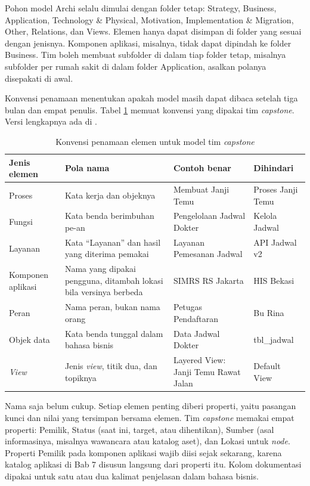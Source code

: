 Pohon model Archi selalu dimulai dengan folder tetap: Strategy, Business,
Application, Technology \& Physical, Motivation, Implementation \& Migration,
Other, Relations, dan Views. Elemen hanya dapat disimpan di folder yang
sesuai dengan jenisnya. Komponen aplikasi, misalnya, tidak dapat dipindah ke
folder Business. Tim boleh membuat subfolder di dalam tiap folder tetap,
misalnya subfolder per rumah sakit di dalam folder Application, asalkan
polanya disepakati di awal.

Konvensi penamaan menentukan apakah model masih dapat dibaca setelah tiga
bulan dan empat penulis. Tabel \ref{tab:ch04-konvensi} memuat konvensi yang
dipakai tim \textit{capstone}. Versi lengkapnya ada di
.

\begin{table}[!htb]
  \centering
  \caption{Konvensi penamaan elemen untuk model tim \textit{capstone}}
  \label{tab:ch04-konvensi}
  \small
  \begin{tabularx}{\textwidth}{>{\raggedright\arraybackslash}p{2.4cm}>{\raggedright\arraybackslash}X>{\raggedright\arraybackslash}p{3.1cm}>{\raggedright\arraybackslash}p{2.6cm}}
    \hline
    \textbf{Jenis elemen} & \textbf{Pola nama} & \textbf{Contoh benar} & \textbf{Dihindari} \\
    \hline
    Proses & Kata kerja dan objeknya & Membuat Janji Temu & Proses Janji Temu \\
    \hline
    Fungsi & Kata benda berimbuhan pe-an & Pengelolaan Jadwal Dokter & Kelola Jadwal \\
    \hline
    Layanan & Kata ``Layanan'' dan hasil yang diterima pemakai & Layanan Pemesanan Jadwal & API Jadwal v2 \\
    \hline
    Komponen aplikasi & Nama yang dipakai pengguna, ditambah lokasi bila versinya berbeda & SIMRS RS Jakarta & HIS Bekasi \\
    \hline
    Peran & Nama peran, bukan nama orang & Petugas Pendaftaran & Bu Rina \\
    \hline
    Objek data & Kata benda tunggal dalam bahasa bisnis & Data Jadwal Dokter & tbl\_jadwal \\
    \hline
    \textit{View} & Jenis \textit{view}, titik dua, dan topiknya & Layered View: Janji Temu Rawat Jalan & Default View \\
    \hline
  \end{tabularx}
\end{table}

Nama saja belum cukup. Setiap elemen penting diberi properti, yaitu pasangan
kunci dan nilai yang tersimpan bersama elemen. Tim \textit{capstone} memakai
empat properti: Pemilik, Status (saat ini, target, atau dihentikan), Sumber
(asal informasinya, misalnya wawancara atau katalog aset), dan Lokasi untuk
\textit{node}. Properti Pemilik pada komponen aplikasi wajib diisi sejak
sekarang, karena katalog aplikasi di Bab 7 disusun langsung dari properti
itu. Kolom dokumentasi dipakai untuk satu atau dua kalimat penjelasan dalam
bahasa bisnis.

